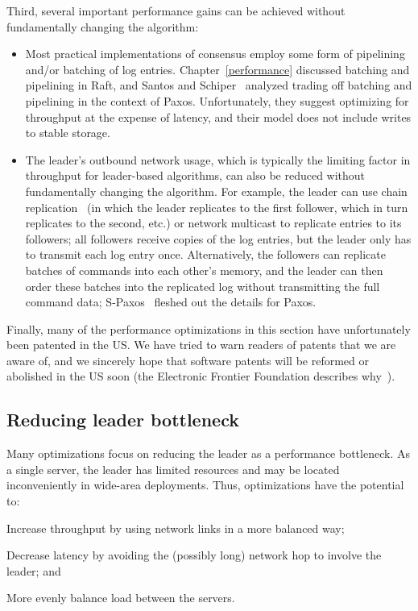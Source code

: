 Third, several important performance gains can be achieved without
fundamentally changing the algorithm:
%
\begin{itemize}
%
\item Most practical implementations of consensus employ some form of
pipelining and/or batching of log entries. Chapter~\ref{performance}
discussed batching and pipelining in Raft, and Santos and
Schiper~\cite{Santos:2012} analyzed trading off batching and pipelining
in the context of Paxos. Unfortunately, they suggest optimizing for
throughput at the expense of latency, and their model does not include
writes to stable storage.
%
\item The leader's outbound network usage, which is typically the limiting
factor in throughput for leader-based algorithms, can also be reduced
without fundamentally changing the algorithm. For example, the leader
can use chain replication~\cite{Ghemawat:2003,Renesse:2004}
(in which the leader replicates to the first follower, which in turn
replicates to the second, etc.) or network multicast to
replicate entries to its followers; all followers receive copies
of the log entries, but the leader only has to transmit each log entry
once. Alternatively, the followers can replicate batches of commands
into each other's memory, and the leader can then order these batches
into the replicated log without transmitting the full command data;
S-Paxos~\cite{Biely:2012} fleshed out the details for Paxos.
%
\end{itemize}

Finally, many of the performance optimizations in this section have
unfortunately been patented in the US. We have tried to warn readers of
patents that we are aware of, and we sincerely hope that software
patents will be reformed or abolished in the US soon (the Electronic
Frontier Foundation describes why~\cite{eff}).



\subsection{Reducing leader bottleneck}

Many optimizations focus on reducing the leader as a performance
bottleneck. As a single server, the leader has limited resources
and may be located inconveniently in wide-area deployments. Thus,
optimizations have the potential to:
%
\begin{compactitem}
%
\item Increase throughput by using network links in a more balanced way;
%
\item Decrease latency by avoiding the (possibly long) network hop
to involve the leader; and
%
\item More evenly balance load between the servers.
%
\end{compactitem}

